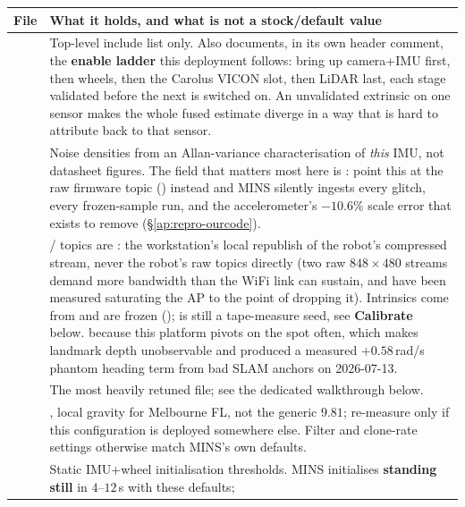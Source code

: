 \begin{center}\small
\begin{longtable}{@{}L{2.9cm}L{9.9cm}@{}}
\toprule
File & What it holds, and what is not a stock/default value \\
\midrule
\endhead
{} & Top-level include list only. Also documents, in its own
  header comment, the \textbf{enable ladder} this deployment follows: bring
  up camera+IMU first, then wheels, then the Carolus VICON slot, then
  LiDAR last, each stage validated before the next is switched on. An
  unvalidated extrinsic on one sensor makes the whole fused estimate diverge
  in a way that is hard to attribute back to that sensor. \\
 & Noise densities from an Allan-variance
  characterisation of \emph{this} IMU, not datasheet figures. The field that
  matters most here is : point this at the
  raw firmware topic () instead and MINS silently
  ingests every glitch, every frozen-sample run, and the accelerometer's
  $-10.6\%$ scale error that  exists to remove
  (\S\ref{ap:repro-ourcode}). \\
 & / topics are
  : the workstation's local
  republish of the robot's compressed stream, never the robot's raw topics
  directly (two raw $848\times480$ streams demand more bandwidth than the
  WiFi link can sustain, and have been measured saturating the AP to the
  point of dropping it). Intrinsics come from 
  and are frozen ();  is still a
  tape-measure seed, see \textbf{Calibrate} below.  because
  this platform pivots on the spot often, which makes landmark depth
  unobservable and produced a measured $+0.58$\,rad/s phantom heading term
  from bad SLAM anchors on 2026-07-13. \\
 & The most heavily retuned file; see the dedicated
  walkthrough below. \\
 & , local gravity for
  Melbourne FL, not the generic $9.81$; re-measure only if this configuration
  is deployed somewhere else. Filter and clone-rate settings otherwise match
  MINS's own defaults. \\
 & Static IMU+wheel initialisation thresholds. MINS
  initialises \textbf{standing still} in $4$--$12$\,s with these defaults;

\end{longtable}
\end{center}
